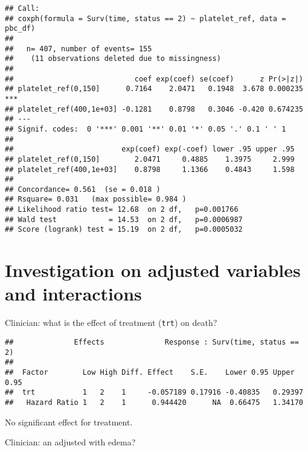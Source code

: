 \documentclass[]{book}
\newenvironment{Shaded}{\begin{snugshade}}{\end{snugshade}}
\newcommand{\KeywordTok}[1]{\textcolor[rgb]{0.13,0.29,0.53}{\textbf{{#1}}}}
\newcommand{\DataTypeTok}[1]{\textcolor[rgb]{0.13,0.29,0.53}{{#1}}}
\newcommand{\DecValTok}[1]{\textcolor[rgb]{0.00,0.00,0.81}{{#1}}}
\newcommand{\StringTok}[1]{\textcolor[rgb]{0.31,0.60,0.02}{{#1}}}
\newcommand{\NormalTok}[1]{{#1}}
\theoremstyle{definition}
\theoremstyle{definition}
\theoremstyle{definition}
\theoremstyle{remark}
\begin{document}
\begin{verbatim}
## Call:
## coxph(formula = Surv(time, status == 2) ~ platelet_ref, data = pbc_df)
## 
##   n= 407, number of events= 155 
##    (11 observations deleted due to missingness)
## 
##                            coef exp(coef) se(coef)      z Pr(>|z|)    
## platelet_ref(0,150]      0.7164    2.0471   0.1948  3.678 0.000235 ***
## platelet_ref(400,1e+03] -0.1281    0.8798   0.3046 -0.420 0.674235    
## ---
## Signif. codes:  0 '***' 0.001 '**' 0.01 '*' 0.05 '.' 0.1 ' ' 1
## 
##                         exp(coef) exp(-coef) lower .95 upper .95
## platelet_ref(0,150]        2.0471     0.4885    1.3975     2.999
## platelet_ref(400,1e+03]    0.8798     1.1366    0.4843     1.598
## 
## Concordance= 0.561  (se = 0.018 )
## Rsquare= 0.031   (max possible= 0.984 )
## Likelihood ratio test= 12.68  on 2 df,   p=0.001766
## Wald test            = 14.53  on 2 df,   p=0.0006987
## Score (logrank) test = 15.19  on 2 df,   p=0.0005032
\end{verbatim}

\section{Investigation on adjusted variables and
interactions}\label{adjusted2}

Clinician: what is the effect of treatment (\texttt{trt}) on death?

\begin{Shaded}
\end{Shaded}

\begin{verbatim}
##              Effects              Response : Surv(time, status == 2) 
## 
##  Factor        Low High Diff. Effect    S.E.    Lower 0.95 Upper 0.95
##  trt           1   2    1     -0.057189 0.17916 -0.40835   0.29397   
##   Hazard Ratio 1   2    1      0.944420      NA  0.66475   1.34170
\end{verbatim}

No significant effect for treatment.

Clinician: an adjusted with edema?

\begin{Shaded}
\end{Shaded}
\end{document}
